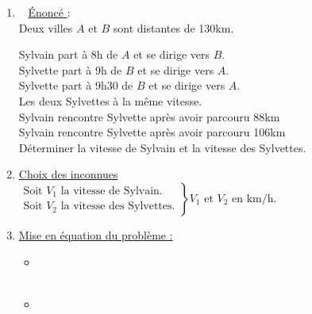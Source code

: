 \begin{enumerate}
\reversemarginpar 

\item \marginpar[\underline{Ex \no 6}]~ \underline{ Énoncé }:\\

Deux villes $A$ et $B$ sont distantes de 130km.

Sylvain part à 8h de $A$ et se dirige vers $B$.\\
Sylvette part à 9h de $B$ et se dirige vers $A$.\\
Sylvette part à 9h30 de $B$ et se dirige vers $A$.\\
Les deux Sylvettes  à la même vitesse.\\
Sylvain rencontre Sylvette après avoir parcouru 88km\\ 
Sylvain rencontre Sylvette après avoir parcouru 106km\\ 
Déterminer la vitesse de Sylvain et la vitesse des Sylvettes.

\item  \underline{Choix des inconnues} \\

$\left. \begin{array}{l}
      \text{Soit } V_1 \text { la vitesse de Sylvain.}\\
      \text {Soit } V_2 \text { la vitesse des Sylvettes.}
\end{array}         
 \right\rbrace V_1 \text{ et } V_2 \text { en km/h}. $        

\medskip             

\item \underline{Mise en équation du problème :  }\\
\begin{itemize}
\item [\ding{87}]  \\

~
 ~\\

\item [\ding{87}]  \\


\end{itemize}
\end{enumerate}
